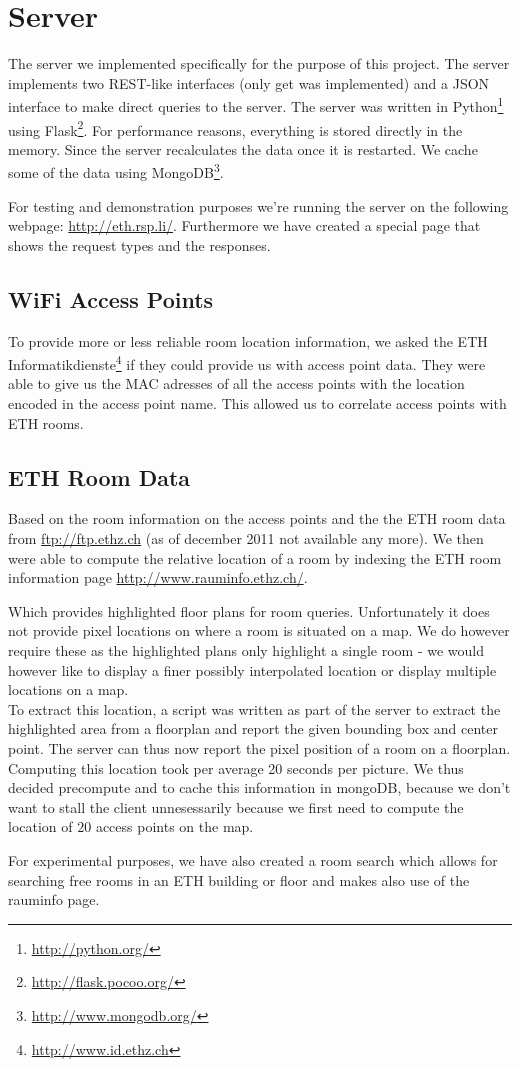 \section{Server}
The server we implemented specifically for the purpose of this project. The server implements two REST-like interfaces (only get was implemented) and a JSON interface to make direct queries to the server. 
The server was written in Python\footnote{\url{http://python.org/}} using Flask\footnote{\url{http://flask.pocoo.org/}}. For performance reasons, everything is stored directly in the memory. Since the server recalculates the data once it is restarted. We cache some of the data using MongoDB\footnote{\url{http://www.mongodb.org/}}. 

For testing and demonstration purposes we're running the server on the following webpage: \url{http://eth.rsp.li/}. Furthermore we have created a special page that shows the request types and the responses. 
\subsection{WiFi Access Points}
To provide more or less reliable room location information, we asked the ETH Informatikdienste\footnote{\url{http://www.id.ethz.ch}} if they could provide us with access point data. They were able to give us the MAC adresses of all the access points with the location encoded in the access point name. This allowed us to correlate access points with ETH rooms. 
\subsection{ETH Room Data}
Based on the room information on the access points and the the ETH room data from \url{ftp://ftp.ethz.ch} (as of december 2011 not available any more). We then were able to compute the relative location of a room by indexing the ETH room information page \url{http://www.rauminfo.ethz.ch/}. 

Which provides highlighted floor plans for room queries. Unfortunately it does not provide pixel locations on where a room is situated on a map. We do however require these as the highlighted plans only highlight a single room - we would however like to display a finer possibly interpolated location or display multiple locations on a map.\\
To extract this location, a script was written as part of the server to extract the highlighted area from a floorplan and report the given bounding box and center point. The server can thus now report the pixel position of a room on a floorplan.
Computing this location took per average 20 seconds per picture. We thus decided precompute and to cache this information in mongoDB, because we don't want to stall the client unnesessarily because we first need to compute the location of $20$ access points on the map. 

For experimental purposes, we have also created a room search which allows for searching free rooms in an ETH building or floor and makes also use of the rauminfo page. 